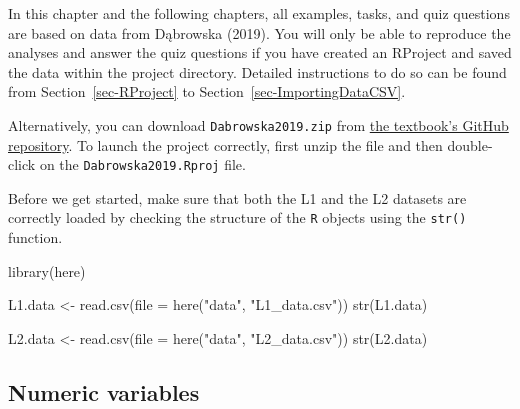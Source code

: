 \documentclass[
  letterpaper,
  DIV=11,
  numbers=noendperiod]{scrreprt}
\newenvironment{Shaded}{\begin{snugshade}}{\end{snugshade}}
\newcommand{\AttributeTok}[1]{\textcolor[rgb]{0.40,0.45,0.13}{#1}}
\newcommand{\FunctionTok}[1]{\textcolor[rgb]{0.28,0.35,0.67}{#1}}
\newcommand{\NormalTok}[1]{\textcolor[rgb]{0.00,0.23,0.31}{#1}}
\newcommand{\OtherTok}[1]{\textcolor[rgb]{0.00,0.23,0.31}{#1}}
\newcommand{\StringTok}[1]{\textcolor[rgb]{0.13,0.47,0.30}{#1}}
\begin{document}
\begin{tcolorbox}[enhanced jigsaw, arc=.35mm, bottomrule=.15mm, bottomtitle=1mm, breakable, colback=white, colbacktitle=quarto-callout-warning-color!10!white, colframe=quarto-callout-warning-color-frame, coltitle=black, left=2mm, leftrule=.75mm, opacityback=0, opacitybacktitle=0.6, rightrule=.15mm, title=\textcolor{quarto-callout-warning-color}{\faExclamationTriangle}\hspace{0.5em}{Prerequisites}, titlerule=0mm, toprule=.15mm, toptitle=1mm]

In this chapter and the following chapters, all examples, tasks, and
quiz questions are based on data from Dąbrowska (2019). You will only be
able to reproduce the analyses and answer the quiz questions if you have
created an RProject and saved the data within the project directory.
Detailed instructions to do so can be found from
Section~\ref{sec-RProject} to Section~\ref{sec-ImportingDataCSV}.

Alternatively, you can download \texttt{Dabrowska2019.zip} from
\href{https://github.com/elenlefoll/RstatsTextbook/raw/69d1e31be7394f2b612825f031ebffeb75886390/Dabrowska2019.zip}{the
textbook's GitHub repository}. To launch the project correctly, first
unzip the file and then double-click on the \texttt{Dabrowska2019.Rproj}
file.

\end{tcolorbox}

Before we get started, make sure that both the L1 and the L2 datasets
are correctly loaded by checking the structure of the \texttt{R} objects
using the \texttt{str()} function.

\begin{Shaded}
\begin{Highlighting}[]
\FunctionTok{library}\NormalTok{(here)}

\NormalTok{L1.data }\OtherTok{\textless{}{-}} \FunctionTok{read.csv}\NormalTok{(}\AttributeTok{file =} \FunctionTok{here}\NormalTok{(}\StringTok{"data"}\NormalTok{, }\StringTok{"L1\_data.csv"}\NormalTok{))}
\FunctionTok{str}\NormalTok{(L1.data)}

\NormalTok{L2.data }\OtherTok{\textless{}{-}} \FunctionTok{read.csv}\NormalTok{(}\AttributeTok{file =} \FunctionTok{here}\NormalTok{(}\StringTok{"data"}\NormalTok{, }\StringTok{"L2\_data.csv"}\NormalTok{))}
\FunctionTok{str}\NormalTok{(L2.data)}
\end{Highlighting}
\end{Shaded}

\subsection{Numeric variables}\label{sec-CheckNumeric}
\end{document}
